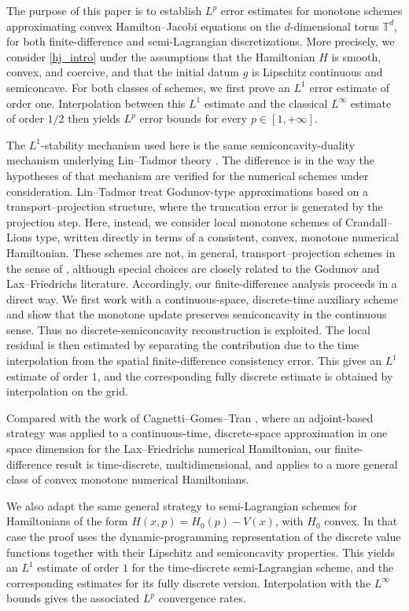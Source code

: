 \documentclass[11pt]{amsart}
\theoremstyle{remark}
\theoremstyle{definition}
\theoremstyle{Claim}
\theoremstyle{plain}
\begin{document}
The purpose of this paper is to establish \(L^p\) error estimates for monotone schemes approximating convex Hamilton--Jacobi equations on the \(d\)-dimensional torus \(\mathbb{T}^d\), for both finite-difference and semi-Lagrangian discretizations. More precisely, we consider \eqref{hj_intro} under the assumptions that the Hamiltonian \(H\) is smooth, convex, and coercive, and that the initial datum \(g\) is Lipschitz continuous and semiconcave. For both classes of schemes, we first prove an \(L^1\) error estimate of order one. Interpolation between this \(L^1\) estimate and the classical \(L^\infty\) estimate of order \(1/2\) then yields \(L^p\) error bounds for every $p\in[1,+\infty]$.

The \(L^1\)-stability mechanism used here is the same semiconcavity-duality mechanism underlying Lin--Tadmor theory \cite{lt}. The difference is in the way the hypotheses of that mechanism are verified for the numerical schemes under consideration. Lin--Tadmor treat Godunov-type approximations based on a transport--projection structure, where the truncation error is generated by the projection step. Here, instead, we consider local monotone schemes of Crandall--Lions type, written directly in terms of a consistent, convex, monotone numerical Hamiltonian. These schemes are not, in general, transport--projection schemes in the sense of \cite{lt}, although special choices are closely related to the Godunov and Lax--Friedrichs literature. Accordingly, our finite-difference analysis proceeds in a direct way. We first work with a continuous-space, discrete-time auxiliary scheme and show that the monotone update preserves semiconcavity in the continuous sense. Thus no discrete-semiconcavity reconstruction is exploited. The local residual is then estimated by separating the contribution due to the time interpolation from the spatial finite-difference consistency error. This gives an \(L^1\) estimate of order $1$, and the corresponding fully discrete estimate is obtained by interpolation on the grid.

Compared with the work of Cagnetti--Gomes--Tran \cite{cgt}, where an adjoint-based strategy was applied to a continuous-time, discrete-space approximation in one space dimension for the Lax--Friedrichs numerical Hamiltonian, our finite-difference result is time-discrete, multidimensional, and applies to a more general class of convex monotone numerical Hamiltonians.

We also adapt the same general strategy to semi-Lagrangian schemes for Hamiltonians of the form \(H(x,p)=H_0(p)-V(x)\), with \(H_0\) convex. In that case the proof uses the dynamic-programming representation of the discrete value functions together with their Lipschitz and semiconcavity properties. This yields an \(L^1\) estimate of order \(1\) for the time-discrete semi-Lagrangian scheme, and the corresponding estimates for its fully discrete version. Interpolation with the \(L^\infty\) bounds gives the associated \(L^p\) convergence rates.
\end{document}
